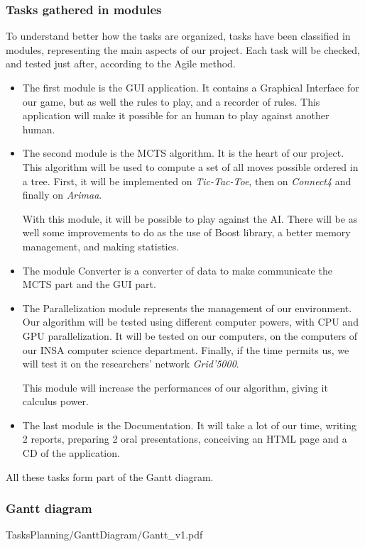 \subsubsection{Tasks gathered in modules}

To understand better how the tasks are organized, tasks have been classified in modules, representing the main aspects of our project. Each task will be checked, and tested just after, according to the Agile method.

\begin{itemize}
  \item The first module is the GUI application. It contains a Graphical Interface for our game, but as well the rules to play, and a recorder of rules. 
This application will make it possible for an human to play against another human.
  \item The second module is the MCTS algorithm. It is the heart of our project. This algorithm will be used to compute a set of all moves possible ordered in a tree. First, it will be implemented on \textit{Tic-Tac-Toe}, then on \textit{Connect4} and finally on \textit{Arimaa}. 

With this module, it will be possible to play against the AI.
There will be as well some improvements to do as the use of Boost library, a better memory management, and making statistics.
  \item The module Converter is a converter of data to make communicate the MCTS part and the GUI part.
  \item The Parallelization module represents the management of our environment. Our algorithm will be tested using different computer powers, with CPU and GPU parallelization. It will be tested on our computers, on the computers of our INSA computer science department. Finally, if the time permits us, we will test it on the researchers' network \textit{Grid'5000}. 

This module will increase the performances of our algorithm, giving it calculus power.
  \item The last module is the Documentation. It will take a lot of our time, writing 2 reports, preparing 2 oral presentations, conceiving an HTML page and a CD of the application.
\end{itemize}
All these tasks form part of the Gantt diagram.

\subsubsection{Gantt diagram}

{TasksPlanning/GanttDiagram/Gantt_v1.pdf}